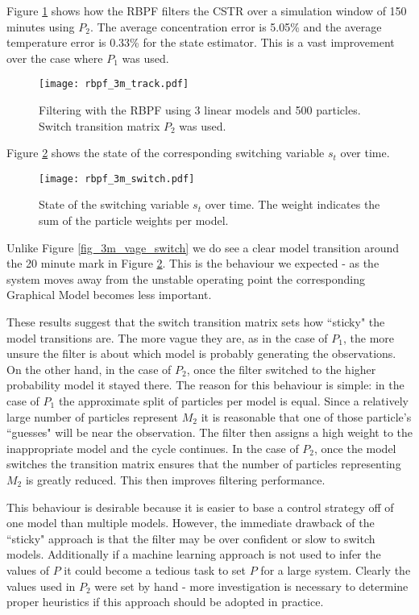 Figure \ref{fig_3m_track} shows how the RBPF filters the CSTR over a simulation window of 150 minutes using $P_2$. The average concentration error is 5.05\% and the average temperature error is 0.33\% for the state estimator. This is a vast improvement over the case where $P_1$ was used.
\begin{figure}[H] 
\centering
\texttt{[image: rbpf\_3m\_track.pdf]}
\caption{Filtering with the RBPF using 3 linear models and 500 particles. Switch transition matrix $P_2$ was used.}
\label{fig_3m_track}
\end{figure}
Figure \ref{fig_3m_switch} shows the state of the corresponding switching variable $s_t$ over time.
\begin{figure}[H] 
\centering
\texttt{[image: rbpf\_3m\_switch.pdf]}
\caption{State of the switching variable $s_t$ over time. The weight indicates the sum of the particle weights per model.}
\label{fig_3m_switch}
\end{figure}
Unlike Figure \ref{fig_3m_vage_switch} we do see a clear model transition around the 20 minute mark in Figure \ref{fig_3m_switch}. This is the behaviour we expected - as the system moves away from the unstable operating point the corresponding Graphical Model becomes less important.

These results suggest that the switch transition matrix sets how ``sticky" the model transitions are. The more vague they are, as in the case of $P_1$, the more unsure the filter is about which model is probably generating the observations. On the other hand, in the case of $P_2$, once the filter switched to the higher probability model it stayed there. The reason for this behaviour is simple: in the case of $P_1$ the approximate split of particles per model is equal. Since a relatively large number of particles represent $M_2$ it is reasonable that one of those particle's ``guesses" will be near the observation. The filter then assigns a high weight to the inappropriate model and the cycle continues. In the case of $P_2$, once the model switches the transition matrix ensures that the number of particles representing $M_2$ is greatly reduced. This then improves filtering performance. 

This behaviour is desirable because it is easier to base a control strategy off of one model than multiple models. However, the immediate drawback of the ``sticky" approach is that the filter may be over confident or slow to switch models. Additionally if a machine learning approach is not used to infer the values of $P$ it could become a tedious task to set $P$ for a large system. Clearly the values used in $P_2$ were set by hand - more investigation is necessary to determine proper heuristics if this approach should be adopted in practice.

